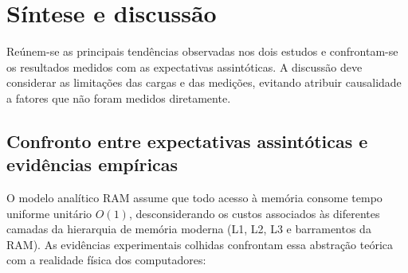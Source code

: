 \documentclass[12pt,a4paper]{report}
\begin{document}
\section{Síntese e discussão}

Reúnem-se as principais tendências observadas nos dois estudos e confrontam-se os resultados medidos com as expectativas assintóticas. A discussão deve considerar as limitações das cargas e das medições, evitando atribuir causalidade a fatores que não foram medidos diretamente.

\subsection{Confronto entre expectativas assintóticas e evidências empíricas}

O modelo analítico RAM assume que todo acesso à memória consome tempo uniforme unitário $O(1)$, desconsiderando os custos associados às diferentes camadas da hierarquia de memória moderna (L1, L2, L3 e barramentos da RAM). As evidências experimentais colhidas confrontam essa abstração teórica com a realidade física dos computadores:
\end{document}
